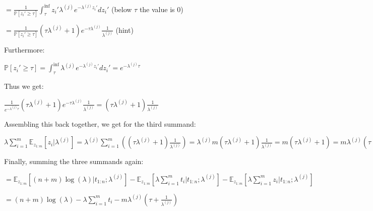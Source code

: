 \(= \frac{1}{\mathbb{P}[z_i' \geq \tau]} \int_{\tau}^{\inf} z_i' \lambda^{(j)} e^{-\lambda^{(j)}z_i'} dz_i'\) (below $\tau$ the value is $0$)

\(= \frac{1}{\mathbb{P}[z_i' \geq \tau]} (\tau\lambda^{(j)}+1)e^{-\tau\lambda^{(j)}}\frac{1}{\lambda^{(j)}}\) (hint)

Furthermore:

\(\mathbb{P}[z_i' \geq \tau]= \int_{\tau}^{\inf} \lambda^{(j)} e^{-\lambda^{(j)}z_i'}dz_i' = e^{-\lambda^{(j)}\tau}\)

Thus we get:

\(\frac{1}{e^{-\lambda^{(j)}\tau}} (\tau\lambda^{(j)}+1)e^{-\tau\lambda^{(j)}}\frac{1}{\lambda^{(j)}}= (\tau\lambda^{(j)}+1)\frac{1}{\lambda^{(j)}}\)

Assembling this back together, we get for the third summand:

\(\lambda\sum_{i=1}^m \mathbb{E}_{z_{1:m}}[z_i | \lambda^{(j)}] = \lambda^{(j)}\sum_{i=1}^m ((\tau\lambda^{(j)}+1)\frac{1}{\lambda^{(j)}}) = \lambda^{(j)} m (\tau\lambda^{(j)}+1)\frac{1}{\lambda^{(j)}} = m (\tau\lambda^{(j)}+1) = m\lambda^{(j)} (\tau + \frac{1}{\lambda^{(j)}})\)

Finally, summing the three summands again:

\(= \mathbb{E}_{z_{1:m}}[(n+m)\log(\lambda) | t_{1:n} ; \lambda^{(j)}] - \mathbb{E}_{z_{1:m}}[\lambda \sum_{i=1}^mt_i | t_{1:n} ; \lambda^{(j)}] - \mathbb{E}_{z_{1:m}}[\lambda\sum_{i=1}^mz_i | t_{1:n} ; \lambda^{(j)}]\)

\(= (n+m)\log(\lambda) - \lambda \sum_{i=1}^m t_i - m\lambda^{(j)} (\tau + \frac{1}{\lambda^{(j)}})\)
